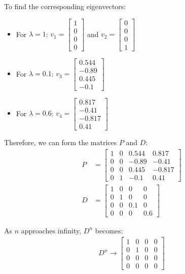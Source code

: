 \documentclass{article}
\begin{document}
To find the corresponding eigenvectors:
\begin{itemize}
    \item For $\lambda = 1$: $v_1 = \begin{bmatrix} 1 \\ 0 \\ 0 \\ 0 \end{bmatrix}$ and $v_2 = \begin{bmatrix} 0 \\ 0 \\ 0 \\ 1 \end{bmatrix}$
    \item For $\lambda = 0.1$: $v_3 = \begin{bmatrix} 0.544 \\ -0.89 \\ 0.445 \\ -0.1 \end{bmatrix}$
    \item For $\lambda = 0.6$: $v_4 = \begin{bmatrix} 0.817 \\ -0.41\\ -0.817 \\ 0.41 \end{bmatrix}$
\end{itemize}

Therefore, we can form the matrices $P$ and $D$:
\begin{align*}
P &= 
\begin{bmatrix}
1 & 0 & 0.544 & 0.817 \\
0 & 0 & -0.89 & -0.41 \\
0 & 0 & 0.445 & -0.817 \\
0 & 1 & -0.1 & 0.41
\end{bmatrix} \\
D &= 
\begin{bmatrix}
1 & 0 & 0 & 0 \\
0 & 1 & 0 & 0 \\
0 & 0 & 0.1 & 0 \\
0 & 0 & 0 & 0.6
\end{bmatrix}
\end{align*}

As $n$ approaches infinity, $D^n$ becomes:
\begin{align*}
D^n \to
\begin{bmatrix}
1 & 0 & 0 & 0 \\
0 & 1 & 0 & 0 \\
0 & 0 & 0 & 0 \\
0 & 0 & 0 & 0
\end{bmatrix}
\end{align*}
\end{document}
